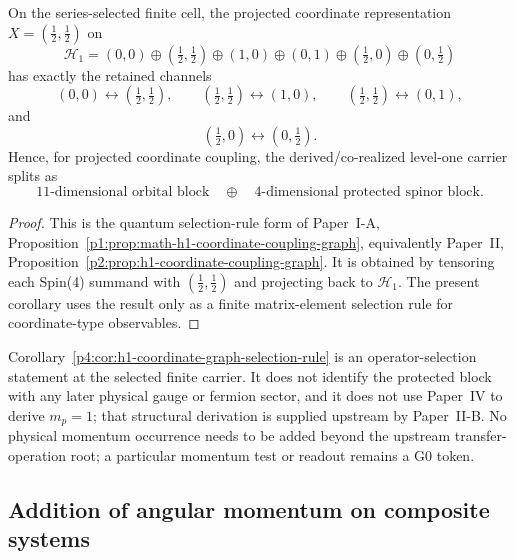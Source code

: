 \documentclass[12pt,a4paper]{article}
\begin{document}
\begin{corollary}
\label{p4:cor:h1-coordinate-graph-selection-rule}
On the series-selected finite cell, the projected coordinate representation
\(X=(\frac12,\frac12)\) on
\[
\mathcal H_1=(0,0)\oplus(\tfrac12,\tfrac12)\oplus(1,0)\oplus(0,1)
\oplus(\tfrac12,0)\oplus(0,\tfrac12)
\]
has exactly the retained channels
\[
(0,0)\leftrightarrow(\tfrac12,\tfrac12),
\qquad
(\tfrac12,\tfrac12)\leftrightarrow(1,0),
\qquad
(\tfrac12,\tfrac12)\leftrightarrow(0,1),
\]
and
\[
(\tfrac12,0)\leftrightarrow(0,\tfrac12).
\]
Hence, for projected coordinate coupling, the derived/co-realized level-one carrier splits as
\[
  11\text{-dimensional orbital block}
  \quad\oplus\quad
  4\text{-dimensional protected spinor block}.
\]
\end{corollary}


\begin{proof}
This is the quantum selection-rule form of Paper~I-A, Proposition~\ref{p1:prop:math-h1-coordinate-coupling-graph}, equivalently Paper~II, Proposition~\ref{p2:prop:h1-coordinate-coupling-graph}.
It is obtained by tensoring each Spin(4) summand with \((\frac12,\frac12)\) and projecting back to \(\mathcal H_1\).
The present corollary uses the result only as a finite matrix-element selection rule for coordinate-type observables.
\end{proof}

\begin{remark}
\label{p4:rem:h1-coordinate-graph-status}
Corollary~\ref{p4:cor:h1-coordinate-graph-selection-rule} is an operator-selection statement at the selected finite carrier.
It does not identify the protected block with any later physical gauge or
fermion sector, and it does not use Paper~IV to derive \(m_p=1\); that
structural derivation is supplied upstream by Paper~II-B.  No physical
momentum occurrence needs to be added beyond the upstream transfer-operation
root; a particular momentum test or readout remains a G0 token.
\end{remark}



\subsection{Addition of angular momentum on composite systems}
\label{p4:sec:part2-addition}
\end{document}
